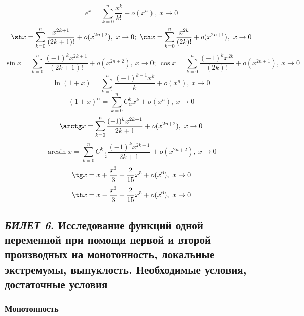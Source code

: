 \documentclass[12pt, a4paper, reqno]{article}
\begin{document}
    \begin{equation*}
        e^x = \sum\limits_{k = 0}^{n} \frac{x^k}{k!} + o(x^n),\ x\to 0
    \end{equation*}
    \begin{equation*}
        \sh x = \sum\limits_{k = 0}^{n} \frac{x^{2k + 1}}{(2k + 1)!} + o(x^{2n + 2}),\ x\to 0;\
        \ch x = \sum\limits_{k = 0}^{n} \frac{x^{2k}}{(2k)!} + o(x^{2n + 1}),\ x\to 0
    \end{equation*}
    \begin{equation*}
        \sin x = \sum\limits_{k = 0}^{n} \frac{(-1)^kx^{2k + 1}}{(2k + 1)!} + o(x^{2n + 2}),\ x \to 0;\
        \cos x = \sum\limits_{k = 0}^{n} \frac{(-1)^kx^{2k}}{(2k)!} + o(x^{2n + 1}),\ x \to 0
    \end{equation*}
    \begin{equation*}
        \ln (1 + x) = \sum\limits_{k = 1}^{n} \frac{(-1)^{k - 1}x^k}{k} + o(x^n),\ x \to 0
    \end{equation*}
    \begin{equation*}
        (1 + x)^{\alpha} = \sum\limits_{k = 0}^{n} C_{\alpha}^{k}x^k + o(x^n),\ x \to 0
    \end{equation*}
    \begin{equation*}
        \arctg x = \sum\limits_{k = 0}^{n} \dfrac{(-1)^kx^{2k + 1}}{2k + 1} + o(x^{2n + 2}),\ x \to 0
    \end{equation*}
    \begin{equation*}
        \arcsin x =\sum\limits_{k = 0}^{n} C_{-\frac{1}{2}}^{k}\dfrac{(-1)^kx^{2k + 1}}{2k + 1} +
        o(x^{2n + 2}),\ x \to 0
    \end{equation*}
    \begin{equation*}
        \tg x = x + \dfrac{x^3}{3} + \dfrac{2}{15}x^5 + o(x^6),\ x \to 0
    \end{equation*}
    \begin{equation*}
        \th x = x - \dfrac{x^3}{3} + \dfrac{2}{15}x^5 + o(x^6),\ x \to 0
    \end{equation*}

\newpage
\subsection{\textit{БИЛЕТ 6}. Исследование функций одной переменной при помощи первой и второй
            производных на монотонность, локальные экстремумы, выпуклость. Необходимые условия,
            достаточные условия}

    \subsubsection{Монотонность}
\end{document}
